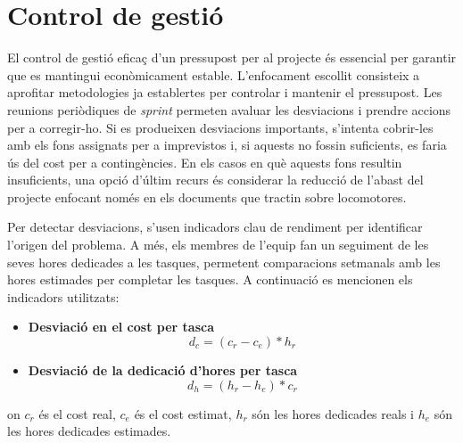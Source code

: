\section{Control de gestió}
El control de gestió eficaç d'un pressupost per al projecte és essencial per garantir que es mantingui econòmicament estable. L'enfocament escollit consisteix a aprofitar metodologies ja establertes per controlar i mantenir el pressupost. Les reunions periòdiques de \textit{sprint} permeten avaluar les desviacions i prendre accions per a corregir-ho. Si es produeixen desviacions importants, s'intenta cobrir-les amb els fons assignats per a imprevistos i, si aquests no fossin suficients, es faria ús del cost per a contingències. En els casos en què aquests fons resultin insuficients, una opció d'últim recurs és considerar la reducció de l'abast del projecte enfocant només en els documents que tractin sobre locomotores. 

Per detectar desviacions, s'usen indicadors clau de rendiment per identificar l'origen del problema. A més, els membres de l'equip fan un seguiment de les seves hores dedicades a les tasques, permetent comparacions setmanals amb les hores estimades per completar les tasques. A continuació es mencionen els indicadors utilitzats:

\begin{itemize}
    \item \textbf{Desviació en el cost per tasca}
    \[d_c = (c_r - c_e) * h_r\]
    \item \textbf{Desviació de la dedicació d'hores per tasca}
    \[d_h = (h_r - h_e) * c_r\]
\end{itemize}

on $c_r$ és el cost real, $c_e$ és el cost estimat, $h_r$ són les hores dedicades reals i $h_e$ són les hores dedicades estimades.